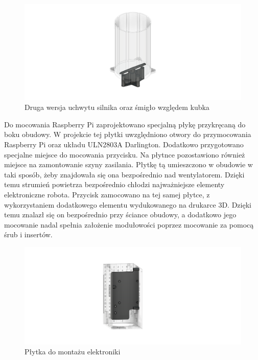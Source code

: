 \begin{figure}[H]
    \centering
    \includegraphics[width=0.95\linewidth]{chapters/03-praca-wlasna/figures/uchwyt_v2.png}
    \caption{\label{fig:uchwyt}Druga wersja uchwytu silnika oraz śmigło względem kubka}
\end{figure}

Do mocowania Raspberry Pi zaprojektowano specjalną płykę przykręcaną do boku obudowy. W projekcie tej płytki uwzględniono otwory do przymocowania Raspberry
Pi oraz układu ULN2803A Darlington. Dodatkowo przygotowano specjalne miejsce do mocowania przycisku. Na płytnce pozostawiono również miejsce
na zamontowanie szyny zasilania. Płytkę tą umieszczono w obudowie w taki sposób, żeby znajdowała się ona bezpośrednio nad wentylatorem. Dzięki temu
strumień powietrza bezpośrednio chłodzi najważniejsze elementy elektroniczne robota. Przycisk zamocowano na tej samej płytce, z wykorzystaniem
dodatkowego elementu wydukowanego na drukarce 3D. Dzięki temu znalazł się on bezpośrednio przy ściance obudowy, a dodatkowo jego mocowanie
nadal spełnia założenie modułowości poprzez mocowanie za pomocą śrub i insertów.

\begin{figure}[H]
    \centering
    \includegraphics[width=0.95\linewidth]{chapters/03-praca-wlasna/figures/main_board.png}
    \caption{\label{fig:mainboard}Płytka do montażu elektroniki}
\end{figure}

